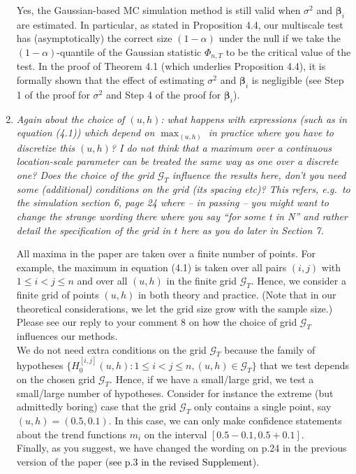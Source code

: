 \documentclass[a4paper,12pt]{article}
\newcommand{\reference}[1]{\textcolor{black}{#1}}
\begin{document}
\begin{enumerate}[label=\arabic*.,leftmargin=0.6cm]
Yes, the Gaussian-based MC simulation method is still valid when $\sigma^2$ and $\boldsymbol{\beta}_i$ are estimated. In particular, as stated in Proposition 4.4, our multiscale test has (asymptotically) the correct size $(1-\alpha)$ under the null if we take the $(1-\alpha)$-quantile of the Gaussian statistic $\Phi_{n,T}$ to be the critical value of the test. In the proof of Theorem 4.1 (which underlies Proposition 4.4), it is formally shown that the effect of estimating $\sigma^2$ and $\boldsymbol{\beta}_i$ is negligible (see Step 1 of the proof for $\sigma^2$ and Step 4 of the proof for $\boldsymbol{\beta}_i$).
  

\item \textit{Again about the choice of $(u, h)$: what happens with expressions (such as in equation (4.1)) which depend on $\max_{(u,h)}$ in practice where you have to discretize this $(u, h)$? I do not think that a maximum over a continuous location-scale parameter can be treated the same way as one over a discrete one? Does the choice of the grid $\mathcal{G}_T$ influence the results here, don't you need some (additional) conditions on the grid (its spacing etc)? This refers, e.g.\ to the simulation section 6, page 24 where -- in passing -- you might want to change the strange wording there where you say ``for some t in N'' and rather detail the specification of the grid in $t$ here as you do later in Section 7.}  

All maxima in the paper are taken over a finite number of points. For example, the maximum in equation (4.1) is taken over all pairs $(i,j)$ with $1 \le i < j \le n$ and over all $(u,h)$ in the finite grid $\mathcal{G}_T$. Hence, we consider a finite grid of points $(u,h)$ in both theory and practice. (Note that in our theoretical considerations, we let the grid size grow with the sample size.) \\
Please see our reply to your comment 8 on how the choice of grid $\mathcal{G}_T$ influences our methods. \\
We do not need extra conditions on the grid $\mathcal{G}_T$ because the family of hypotheses $\{H_0^{[i,j]}(u,h): 1 \le i < j \le n, (u,h) \in \mathcal{G}_T \}$ that we test depends on the chosen grid $\mathcal{G}_T$. Hence, if we have a small/large grid, we test a small/large number of hypotheses. Consider for instance the extreme (but admittedly boring) case that the grid $\mathcal{G}_T$ only contains a single point, say $(u,h) = (0.5, 0.1)$. In this case, we can only make confidence statements about the trend functions $m_i$ on the interval $[0.5-0.1,0.5+0.1]$. \\
Finally, as you suggest, we have changed the wording on p.24 in the previous version of the paper (\reference{see p.3 in the revised Supplement}). 



\end{enumerate}
\end{document}
